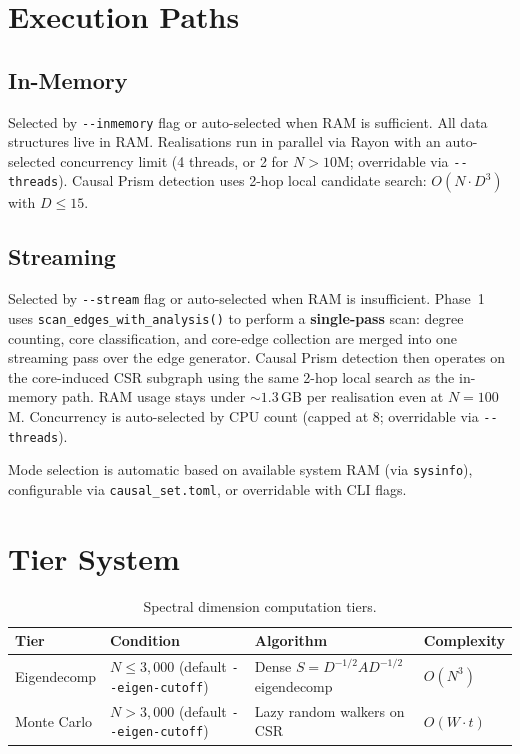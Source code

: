 \documentclass[11pt, a4paper, openany]{book}
\newcommand{\code}[1]{\texttt{#1}}
\newcommand{\func}[1]{\texttt{\color{structure}#1}}
\newcounter{thm}[chapter]
\begin{document}
\section{Execution Paths}

\subsection{In-Memory}
Selected by \code{-{}-inmemory} flag or auto-selected when RAM is sufficient.
All data structures live in RAM.  Realisations run in parallel via Rayon with an
auto-selected concurrency limit (4 threads, or 2 for $N > 10$M; overridable via
\code{-{}-threads}).  Causal Prism detection uses 2-hop local candidate search:
$O(N \cdot D^3)$ with $D \le 15$.

\subsection{Streaming}
Selected by \code{-{}-stream} flag or auto-selected when RAM is insufficient.
Phase~1 uses \func{scan\_edges\_with\_analysis()} to perform a \textbf{single-pass}
scan: degree counting, core classification, and core-edge collection are merged
into one streaming pass over the edge generator.  Causal Prism detection then
operates on the core-induced CSR subgraph using the same 2-hop local search as
the in-memory path.  RAM usage stays under ${\sim}1.3$\,GB per realisation even
at $N = 100$M.  Concurrency is auto-selected by CPU count (capped at 8;
overridable via \code{-{}-threads}).

Mode selection is automatic based on available system RAM (via \code{sysinfo}),
configurable via \code{causal\_set.toml}, or overridable with CLI flags.

\section{Tier System}

\begin{table}[H]
\centering
\begin{tabular}{@{} l l l l @{}}
\toprule
\textbf{Tier} & \textbf{Condition} & \textbf{Algorithm} & \textbf{Complexity} \\
\midrule
Eigendecomp & $N \le 3{,}000$ (default \code{-{}-eigen-cutoff}) & Dense $S = D^{-1/2}AD^{-1/2}$ eigendecomp & $O(N^3)$ \\
Monte Carlo & $N > 3{,}000$ (default \code{-{}-eigen-cutoff}) & Lazy random walkers on CSR & $O(W \cdot t)$ \\
\bottomrule
\end{tabular}
\caption{Spectral dimension computation tiers.}
\end{table}
\end{document}
